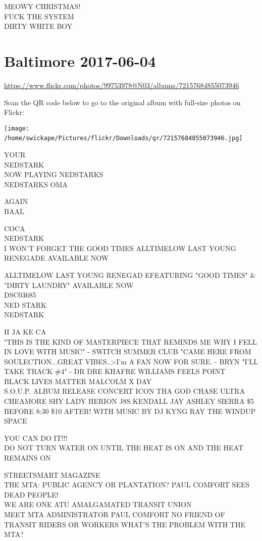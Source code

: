 \documentclass[10pt,letterpaper]{article}
\begin{document}
MEOWY CHRISTMAS!\\
FUCK THE SYSTEM\\
DIRTY WHITE BOY
\

\section*{Baltimore 2017-06-04}

\url{https://www.flickr.com/photos/99753978@N03/albums/72157684855073946}

Scan the QR code below to go to the original album with full-size photos on Flickr:

\texttt{[image: /home/swickape/Pictures/flickr/Downloads/qr/72157684855073946.jpg]}
\

YOUR\\
NEDSTARK\\
NOW PLAYING NEDSTARKS\\
NEDSTARKS OMA

AGAIN\\
BAAL

COCA\\
NEDSTARK\\
I WON'T FORGET THE GOOD TIMES ALLTIMELOW LAST YOUNG RENEGADE AVAILABLE NOW

ALLTIMELOW LAST YOUNG RENEGAD EFEATURING "GOOD TIMES" \& "DIRTY LAUNDRY" AVAILABLE NOW\\
DSC03685\\
NED STARK\\
NEDSTARK

H JA KE CA\\
"THIS IS THE KIND OF MASTERPIECE THAT REMINDS ME WHY I FELL IN LOVE WITH MUSIC" {-} SWITCH SUMMER CLUB "CAME HERE FROM SOULECTION...GREAT VIBES..>I'm A FAN NOW FOR SURE.  {-} BRYN "I'LL TAKE TRACK \#4" {-} DR DRE KHAFRE WILLIAMS FEELS POINT\\
BLACK LIVES MATTER MALCOLM X DAY\\
S.O.U.P. ALBUM RELEASE CONCERT ICON THA GOD CHASE ULTRA CHEAMORE SHY LADY HERION J8S KENDALL JAY ASHLEY SIERRA \$5 BEFORE 8:30 \$10 AFTER!  WITH MUSIC BY DJ KYNG RAY THE WINDUP SPACE

YOU CAN DO IT!!!\\
DO NOT TURN WATER ON UNTIL THE HEAT IS ON AND THE HEAT REMAINS ON

STREETSMART MAGAZINE\\
THE MTA: PUBLIC AGENCY OR PLANTATION?  PAUL COMFORT SEES DEAD PEOPLE!\\
WE ARE ONE ATU AMALGAMATED TRANSIT UNION\\
MEET MTA ADMINISTRATOR PAUL COMFORT NO FRIEND OF TRANSIT RIDERS OR WORKERS WHAT'S THE PROBLEM WITH THE MTA?
\end{document}
